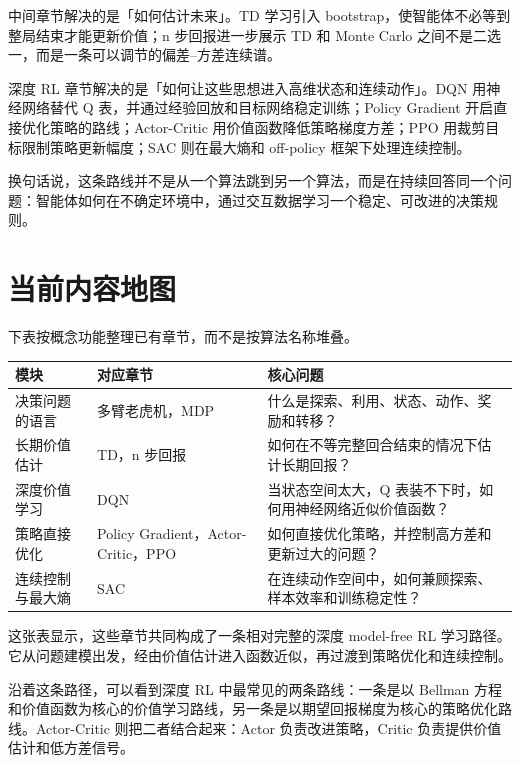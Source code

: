 \documentclass{article}
\begin{document}
中间章节解决的是「如何估计未来」。TD 学习引入 bootstrap，使智能体不必等到整局结束才能更新价值；n 步回报进一步展示 TD 和 Monte Carlo 之间不是二选一，而是一条可以调节的偏差--方差连续谱。

深度 RL 章节解决的是「如何让这些思想进入高维状态和连续动作」。DQN 用神经网络替代 Q 表，并通过经验回放和目标网络稳定训练；Policy Gradient 开启直接优化策略的路线；Actor-Critic 用价值函数降低策略梯度方差；PPO 用裁剪目标限制策略更新幅度；SAC 则在最大熵和 off-policy 框架下处理连续控制。

换句话说，这条路线并不是从一个算法跳到另一个算法，而是在持续回答同一个问题：智能体如何在不确定环境中，通过交互数据学习一个稳定、可改进的决策规则。

\section*{当前内容地图}

下表按概念功能整理已有章节，而不是按算法名称堆叠。

\begin{center}
\begin{tabular}{p{3.2cm}|p{4.2cm}|p{7.0cm}}
\textbf{模块} & \textbf{对应章节} & \textbf{核心问题} \\
\hline
决策问题的语言 &
多臂老虎机，MDP &
什么是探索、利用、状态、动作、奖励和转移？ \\
\hline
长期价值估计 &
TD，n 步回报 &
如何在不等完整回合结束的情况下估计长期回报？ \\
\hline
深度价值学习 &
DQN &
当状态空间太大，Q 表装不下时，如何用神经网络近似价值函数？ \\
\hline
策略直接优化 &
Policy Gradient，Actor-Critic，PPO &
如何直接优化策略，并控制高方差和更新过大的问题？ \\
\hline
连续控制与最大熵 &
SAC &
在连续动作空间中，如何兼顾探索、样本效率和训练稳定性？
\end{tabular}
\end{center}

这张表显示，这些章节共同构成了一条相对完整的深度 model-free RL 学习路径。它从问题建模出发，经由价值估计进入函数近似，再过渡到策略优化和连续控制。

沿着这条路径，可以看到深度 RL 中最常见的两条路线：一条是以 Bellman 方程和价值函数为核心的价值学习路线，另一条是以期望回报梯度为核心的策略优化路线。Actor-Critic 则把二者结合起来：Actor 负责改进策略，Critic 负责提供价值估计和低方差信号。

\end{document}

